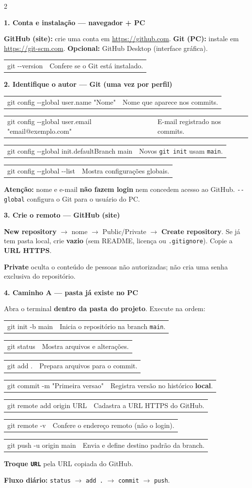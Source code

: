 \documentclass[11pt,a4paper]{article}
\makeatletter
\newcommand{\cheatsect}[2]{\textbf{\fontsize{8.6}{9.8}\selectfont\color{#1}#2}\par\vspace{0.5mm}}
\newcommand{\cheatnote}[1]{{\fontsize{7.8}{9}\selectfont#1}\par}
\newcommand{\cheatcmd}[2]{\noindent\begin{tabularx}{\linewidth}{@{}>{\raggedright\arraybackslash}p{.58\linewidth}@{\hspace{1.2mm}}>{\raggedright\arraybackslash}X@{}}\ttfamily\fontsize{7.8}{9}\selectfont#1 & \fontsize{7.8}{9}\selectfont#2\end{tabularx}\vspace{0.3mm}}
\makeatother
\begin{document}
\begin{multicols}{2}
\begin{tcolorbox}[cheatbox]
\cheatsect{PrimaryBlue}{1. Conta e instalação --- navegador + PC}
\cheatnote{\textbf{GitHub (site):} crie uma conta em \url{https://github.com}. \textbf{Git (PC):} instale em \url{https://git-scm.com}. \textbf{Opcional:} GitHub Desktop (interface gráfica).}
\cheatcmd{git -{}-version}{Confere se o Git está instalado.}
\end{tcolorbox}

\begin{tcolorbox}[cheatboxlocal]
\cheatsect{DarkGray}{2. Identifique o autor --- Git (uma vez por perfil)}
\cheatcmd{git config -{}-global user.name "Nome"}{Nome que aparece nos commits.}
\cheatcmd{git config -{}-global user.email "email@exemplo.com"}{E-mail registrado nos commits.}
\cheatcmd{git config -{}-global init.defaultBranch main}{Novos \texttt{git init} usam \texttt{main}.}
\cheatcmd{git config -{}-global -{}-list}{Mostra configurações globais.}
\cheatnote{\textbf{Atenção:} nome e e-mail \textbf{não fazem login} nem concedem acesso ao GitHub. \texttt{-{}-global} configura o Git para o usuário do PC.}
\end{tcolorbox}

\begin{tcolorbox}[cheatbox]
\cheatsect{PrimaryBlue}{3. Crie o remoto --- GitHub (site)}
\cheatnote{\textbf{New repository} $\rightarrow$ nome $\rightarrow$ Public/Private $\rightarrow$ \textbf{Create repository}. Se já tem pasta local, crie \textbf{vazio} (sem README, licença ou \texttt{.gitignore}). Copie a \textbf{URL HTTPS}.}
\cheatnote{\textbf{Private} oculta o conteúdo de pessoas não autorizadas; não cria uma senha exclusiva do repositório.}
\end{tcolorbox}

\begin{tcolorbox}[cheatboxlocal]
\cheatsect{DarkGray}{4. Caminho A --- pasta já existe no PC}
\cheatnote{Abra o terminal \textbf{dentro da pasta do projeto}. Execute na ordem:}
\cheatcmd{git init -b main}{Inicia o repositório na branch \texttt{main}.}
\cheatcmd{git status}{Mostra arquivos e alterações.}
\cheatcmd{git add .}{Prepara arquivos para o commit.}
\cheatcmd{git commit -m "Primeira versao"}{Registra versão no histórico \textbf{local}.}
\cheatcmd{git remote add origin URL}{Cadastra a URL HTTPS do GitHub.}
\cheatcmd{git remote -v}{Confere o endereço remoto (não o login).}
\cheatcmd{git push -u origin main}{Envia e define destino padrão da branch.}
\cheatnote{\textbf{Troque \texttt{URL}} pela URL copiada do GitHub.}
{\scriptsize\textbf{Fluxo diário:} \texttt{status} $\rightarrow$ \texttt{add .} $\rightarrow$ \texttt{commit} $\rightarrow$ \texttt{push}.}
\end{tcolorbox}


\end{multicols}
\end{document}
